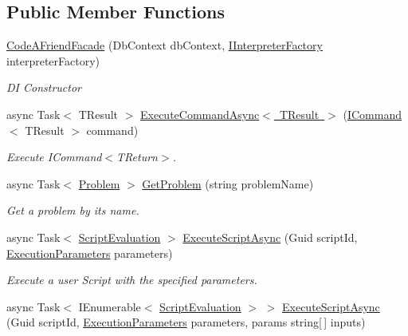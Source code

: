 \subsection*{Public Member Functions}
\begin{DoxyCompactItemize}
\item 
\mbox{\hyperlink{class_code_a_friend_1_1_facade_1_1_code_a_friend_facade_a97f88a6ad57d442f503cbd0aa3de95ae}{Code\+A\+Friend\+Facade}} (Db\+Context db\+Context, \mbox{\hyperlink{interface_code_a_friend_1_1_languages_1_1_core_1_1_i_interpreter_factory}{I\+Interpreter\+Factory}} interpreter\+Factory)
\begin{DoxyCompactList}\small\item\em DI Constructor\end{DoxyCompactList}\item 
async Task$<$ T\+Result $>$ \mbox{\hyperlink{class_code_a_friend_1_1_facade_1_1_code_a_friend_facade_a183e234ee3e7de4e25fb30121dd39891}{Execute\+Command\+Async$<$ T\+Result $>$}} (\mbox{\hyperlink{interface_code_a_friend_1_1_data_model_1_1_i_command}{I\+Command}}$<$ T\+Result $>$ command)
\begin{DoxyCompactList}\small\item\em Execute I\+Command$<$\+T\+Return$>$. \end{DoxyCompactList}\item 
async Task$<$ \mbox{\hyperlink{class_code_a_friend_1_1_data_model_1_1_problem}{Problem}} $>$ \mbox{\hyperlink{class_code_a_friend_1_1_facade_1_1_code_a_friend_facade_a0fd5153f295a66388ef6a6d4880f32bd}{Get\+Problem}} (string problem\+Name)
\begin{DoxyCompactList}\small\item\em Get a problem by its name. \end{DoxyCompactList}\item 
async Task$<$ \mbox{\hyperlink{class_code_a_friend_1_1_data_model_1_1_script_evaluation}{Script\+Evaluation}} $>$ \mbox{\hyperlink{class_code_a_friend_1_1_facade_1_1_code_a_friend_facade_a04883cd14eb596a9f9113c24aa06e34b}{Execute\+Script\+Async}} (Guid script\+Id, \mbox{\hyperlink{class_code_a_friend_1_1_data_model_1_1_execution_parameters}{Execution\+Parameters}} parameters)
\begin{DoxyCompactList}\small\item\em Execute a user Script with the specified parameters. \end{DoxyCompactList}\item 
async Task$<$ I\+Enumerable$<$ \mbox{\hyperlink{class_code_a_friend_1_1_data_model_1_1_script_evaluation}{Script\+Evaluation}} $>$ $>$ \mbox{\hyperlink{class_code_a_friend_1_1_facade_1_1_code_a_friend_facade_abcd7e13b8e5a7accbcd56b4f7eee8934}{Execute\+Script\+Async}} (Guid script\+Id, \mbox{\hyperlink{class_code_a_friend_1_1_data_model_1_1_execution_parameters}{Execution\+Parameters}} parameters, params string\mbox{[}$\,$\mbox{]} inputs)

\end{DoxyCompactItemize}

